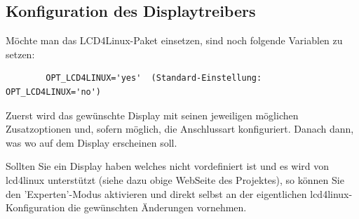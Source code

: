 \subsection{Konfiguration des Displaytreibers}

    Möchte man das LCD4Linux-Paket einsetzen, sind noch folgende Variablen zu
    setzen:

\begin{example}
\begin{verbatim}
        OPT_LCD4LINUX='yes'  (Standard-Einstellung: OPT_LCD4LINUX='no')
\end{verbatim}
\end{example}

    Zuerst wird das gewünschte Display mit seinen jeweiligen möglichen Zusatzoptionen
    und, sofern möglich, die Anschlussart konfiguriert. Danach dann, was wo auf
    dem Display erscheinen soll.

    Sollten Sie ein Display haben welches nicht vordefiniert ist und es wird von
    lcd4linux unterstützt (siehe dazu obige WebSeite des Projektes), so können
    Sie den 'Experten'-Modus aktivieren und direkt selbst an der eigentlichen
    lcd4linux-Konfiguration die gewünschten Änderungen vornehmen.



